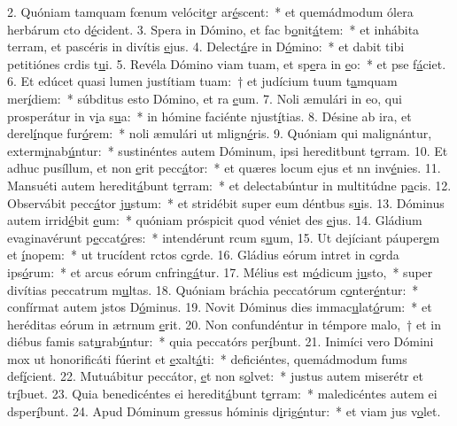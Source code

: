2. Quóniam tamquam fœnum velócit\uline{e}r ar\uline{é}scent:~* et quemádmodum ólera herbárum cto d\uline{é}cident.
3. Spera in Dómino, et fac b\uline{o}nit\uline{á}tem:~* et inhábita terram, et pascéris in divítis \uline{e}jus.
4. Delect\uline{á}re in D\uline{ó}mino:~* et dabit tibi petitiónes crdis t\uline{u}i.
5. Revéla Dómino viam tuam, et sp\uline{e}ra in \uline{e}o:~* et pse f\uline{á}ciet.
6. Et edúcet quasi lumen justítiam tuam:~† et judícium tuum t\uline{a}mquam mer\uline{í}diem:~* súbditus esto Dómino, et ra \uline{e}um.
7. Noli æmulári in eo, qui prosperátur in v\uline{i}a s\uline{u}a:~* in hómine faciénte njust\uline{í}tias.
8. Désine ab ira, et derel\uline{í}nque fur\uline{ó}rem:~* noli æmulári ut mlign\uline{é}ris.
9. Quóniam qui malignántur, exterm\uline{i}nab\uline{ú}ntur:~* sustinéntes autem Dóminum, ipsi hereditbunt t\uline{e}rram.
10. Et adhuc pusíllum, et non \uline{e}rit pecc\uline{á}tor:~* et quæres locum ejus et nn inv\uline{é}nies.
11. Mansuéti autem heredit\uline{á}bunt t\uline{e}rram:~* et delectabúntur in multitúdne p\uline{a}cis.
12. Observábit pecc\uline{á}tor j\uline{u}stum:~* et stridébit super eum déntbus s\uline{u}is.
13. Dóminus autem irrid\uline{é}bit \uline{e}um:~* quóniam próspicit quod véniet des \uline{e}jus.
14. Gládium evaginavérunt p\uline{e}ccat\uline{ó}res:~* intendérunt rcum s\uline{u}um,
15. Ut dejíciant páuper\uline{e}m et \uline{í}nopem:~* ut trucídent rctos c\uline{o}rde.
16. Gládius eórum intret in c\uline{o}rda ips\uline{ó}rum:~* et arcus eórum cnfring\uline{á}tur.
17. Mélius est m\uline{ó}dicum j\uline{u}sto,~* super divítias peccatrum m\uline{u}ltas.
18. Quóniam bráchia peccatórum c\uline{o}nter\uline{é}ntur:~* confírmat autem jstos D\uline{ó}minus.
19. Novit Dóminus dies immac\uline{u}lat\uline{ó}rum:~* et heréditas eórum in ætrnum \uline{e}rit.
20. Non confundéntur in témpore malo,~† et in diébus famis sat\uline{u}rab\uline{ú}ntur:~* quia peccatórs per\uline{í}bunt.
21. Inimíci vero Dómini mox ut honorificáti fúerint et \uline{e}xalt\uline{á}ti:~* deficiéntes, quemádmodum fums def\uline{í}cient.
22. Mutuábitur peccátor, \uline{e}t non s\uline{o}lvet:~* justus autem miserétr et tr\uline{í}buet.
23. Quia benedicéntes ei heredit\uline{á}bunt t\uline{e}rram:~* maledicéntes autem ei dsper\uline{í}bunt.
24. Apud Dóminum gressus hóminis d\uline{i}rig\uline{é}ntur:~* et viam jus v\uline{o}let.
